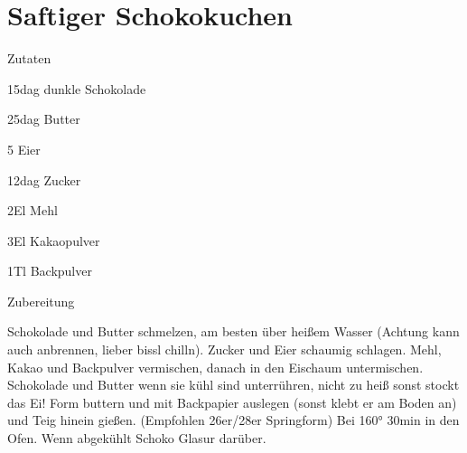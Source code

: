 \chapter*{Saftiger Schokokuchen}
\begin{multicols}{2}
 {\Large Zutaten}
 \begin{Zutaten}
		\item 15dag dunkle Schokolade
		\item 25dag Butter
		\item 5 Eier
		\item 12dag Zucker
		\item 2El Mehl
		\item 3El Kakaopulver
		\item 1Tl Backpulver
		
		
		
		
\end{Zutaten}
	
\columnbreak
{}
\end{multicols}

{\Large Zubereitung} \newline
\begin{addmargin}[1cm]{0cm}
	Schokolade und Butter schmelzen, am besten über heißem Wasser (Achtung kann auch anbrennen, lieber
	bissl chilln).\newline
	Zucker und Eier schaumig schlagen.\newline
	Mehl, Kakao und Backpulver vermischen, danach in den Eischaum untermischen.
	Schokolade und Butter wenn sie kühl sind unterrühren, nicht zu heiß sonst stockt das Ei!\newline
	Form buttern und mit Backpapier auslegen (sonst klebt er am Boden an) und Teig hinein gießen.\newline
	(Empfohlen 26er/28er Springform)\newline
	Bei 160° 30min in den Ofen.\newline\newline
	Wenn abgekühlt Schoko Glasur darüber.
	
	
	
	
\end{addmargin}
